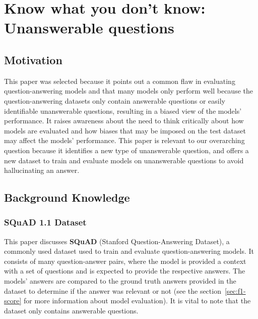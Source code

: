 \documentclass[letterpaper, 11pt]{article}
\begin{document}
\section{Know what you don't know: Unanswerable questions}
\label{sec:know-what-you-dont-know} 

\subsection{Motivation}
This paper \citep{knowwhatyoudont} was selected because it points out a common flaw in evaluating question-answering models and that many models only perform well because the question-answering datasets only contain answerable questions or easily identifiable unanswerable questions,
resulting in a biased view of the models' performance. It raises awareness about the need to think critically about how models are evaluated and how biases that may be imposed on the test dataset may affect the models' performance.
This paper is relevant to our overarching question because it identifies a new type of unanswerable question, and offers a new dataset to train and evaluate models on unanswerable questions to avoid hallucinating an answer.

\subsection{Background Knowledge}
\subsubsection{SQuAD 1.1 Dataset}
\label{sec:squad-1.1}

This paper discusses \textbf{SQuAD} (Stanford Question-Answering Dataset), a commonly used dataset used to train and evaluate question-answering models.
It consists of many question-answer pairs, where the model is provided a context with a set of questions and is expected to provide the respective answers.
The models' answers are compared to the ground truth answers provided in the dataset to determine if the answer was relevant or not (see the section~\ref{sec:f1-score} for more information about model evaluation). 
It is vital to note that the dataset only contains answerable questions.
\\
\end{document}
